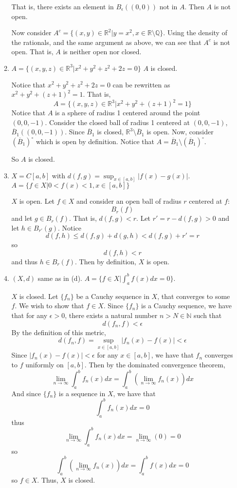 \documentclass{article}
\begin{document}
\begin{enumerate}
\begin{enumerate}
        That is, there exists an element in $B_{\epsilon}((0,0))$ not in $A$. Then $A$ is not open.
        
        Now consider $A^c = \{(x,y) \in \mathbb{R}^2 | y = x^2, x \in \mathbb{R} \setminus \mathbb{Q}\}$. Using the density of the rationals, and the same argument as above, we can see that $A^c$ is not open. That is, $A$ is neither open nor closed.
        
        \item $A = \{(x,y,z) \in \mathbb{R}^3 | x^2 + y^2 + z^2 + 2z = 0\}$
        $A$ is closed.
        
        Notice that $x^2 + y^2 + z^2 + 2z = 0$ can be rewritten as $x^2 + y^2 + (z+1)^2 = 1$. That is,
        \[A = \{(x,y,z) \in \mathbb{R}^3 | x^2 + y^2 + (z+1)^2 = 1\}\]
        Notice that $A$ is a sphere of radius 1 centered around the point $(0,0,-1)$. Consider the closed ball of radius 1 centered at $(0,0,-1)$, $\overline{B}_{1}((0,0,-1))$. Since $\overline{B}_1$ is closed, $\mathbb{R}^3 \setminus \overline{B}_1$ is open. Now, consider $(\overline{B}_1)^{\circ}$ which is open by definition. Notice that $A = \overline{B}_1 \setminus (\overline{B}_1)^{\circ}$.
        
        So $A$ is closed.
        
        \item $X = C[a,b]$ with $d(f,g) = \sup_{x \in [a,b]} |f(x) - g(x)|$. $A = \{f \in X | 0 < f(x) < 1, x \in [a,b]\}$
        
        $X$ is open. Let $f \in X$ and consider an open ball of radius $r$ centered at $f$: 
        \[B_r(f)\]
        and let $g \in B_r(f)$. That is, $d(f,g) < r$. Let $r' = r - d(f,g) > 0$ and let $h \in B_{r'}(g)$. Notice
        \[d(f,h) \leq d(f,g) + d(g,h) < d(f,g) + r' = r\]
        so
        \[d(f,h) < r\]
        and thus $h \in B_r(f)$. Then by definition, $X$ is open.
        
        \item $(X,d)$ same as in (d). $A = \{f \in X | \int_a^b f(x) dx = 0\}$.
        
        $X$ is closed. Let $\{f_n\}$ be a Cauchy sequence in $X$, that converges to some $f$. We wish to show that $f \in X$. Since $\{f_n\}$ is a Cauchy sequence, we have that for any $\epsilon > 0$, there exists a natural number $n > N \in \mathbb{N}$ such that 
        \[d(f_n, f) < \epsilon\]
        By the definition of this metric,
        \[d(f_n, f) = \sup_{x \in [a,b]}|f_n(x) - f(x)| < \epsilon\]
        Since $|f_n(x) - f(x)| < \epsilon$ for any $x \in [a,b]$, we have that $f_n$ converges to $f$ uniformly on $[a,b]$. Then by the dominated convergence theorem,
        \[\lim_{n \to \infty} \int_a^b f_n(x) dx = \int_a^b(\lim_{n \to \infty} f_n(x))dx\]
        And since $\{f_n\}$ is a sequence in $X$, we have that
        \[\int_a^b f_n(x) dx = 0\]
        thus 
        \[\lim_{n \to \infty} \int_a^b f_n(x) dx = \lim_{n \to \infty} (0) = 0\]
        so
        \[\int_a^b (\lim_{n \to \infty} f_n(x))dx = \int_a^b f(x) dx = 0\]
        so $f \in X$. Thus, $X$ is closed.
        

\end{enumerate}
\end{enumerate}
\end{document}
